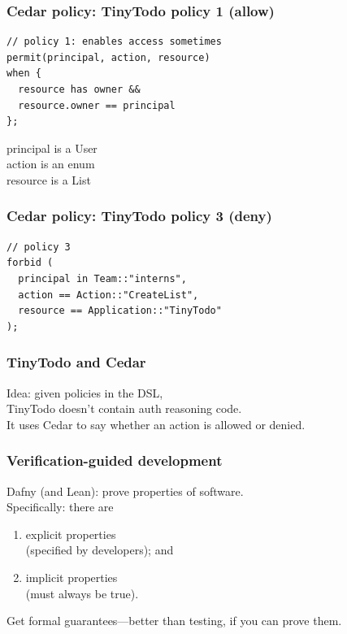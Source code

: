 \documentclass{beamer}
\newenvironment{changemargin}[1]{%
  \begin{list}{}{%
    \setlength{\topsep}{0pt}%
    \setlength{\leftmargin}{#1}%
    \setlength{\rightmargin}{1em}
    \setlength{\listparindent}{\parindent}%
    \setlength{\itemindent}{\parindent}%
    \setlength{\parsep}{\parskip}%
  }%
  \item[]}{\end{list}}
\begin{document}
\begin{frame}[fragile]
  \frametitle{Cedar policy: TinyTodo policy 1 (allow)}
\large
\begin{verbatim}
// policy 1: enables access sometimes
permit(principal, action, resource)
when {
  resource has owner &&
  resource.owner == principal
};
\end{verbatim}
\begin{changemargin}{1cm}
  principal is a User\\
  action is an enum\\
  resource is a List\\
\end{changemargin}
\end{frame}

\begin{frame}[fragile]
  \frametitle{Cedar policy: TinyTodo policy 3 (deny)}
    \large
\begin{verbatim}
// policy 3
forbid (
  principal in Team::"interns",
  action == Action::"CreateList",
  resource == Application::"TinyTodo"
);
\end{verbatim}
\end{frame}

\begin{frame}[fragile]
  \frametitle{TinyTodo and Cedar}
    \Large
    \begin{changemargin}{1cm}
      Idea: given policies in the DSL,\\
      TinyTodo doesn't contain auth reasoning code.\\[1em]
      It uses Cedar to say whether an action is allowed or denied.
    \end{changemargin}
\end{frame}

\begin{frame}[fragile]
  \frametitle{Verification-guided development}
    \Large
    \begin{changemargin}{2cm}
      Dafny (and Lean): prove properties of software.\\[1em]
      Specifically: there are
      \begin{enumerate}
      \item explicit properties \\ \quad (specified by developers); and
      \item implicit properties \\ \quad (must always be true).
      \end{enumerate}

      Get formal guarantees---better than testing, if you can prove them.
    \end{changemargin}
\end{frame}
\end{document}
